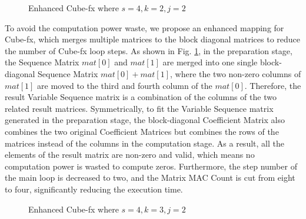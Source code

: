 \begin{figure}[t]
    \caption{Enhanced Cube-fx where $s = 4, k = 2, j = 2$}
    \label{fig:parallel}
    \end{figure}

To avoid the computation power waste, we propose an enhanced mapping for Cube-fx, which merges multiple matrices to the block diagonal matrices to reduce the number of Cube-fx loop steps. As shown in Fig. \ref{fig:parallel}, in the preparation stage, the Sequence Matrix $mat[0]$ and $mat[1]$ are merged into one single block-diagonal Sequence Matrix $mat[0] + mat[1]$, where the two non-zero columns of $mat[1]$ are moved to the third and fourth column of the $mat[0]$. Therefore, the result Variable Sequence matrix is a combination of the columns of the two related result matrices. Symmetrically, to fit the Variable Sequence matrix generated in the preparation stage, the block-diagonal Coefficient Matrix also combines the two original Coefficient Matrices but combines the rows of the matrices instead of the columns in the computation stage. As a result, all the elements of the result matrix are non-zero and valid, which means no computation power is wasted to compute zeros. Furthermore, the step number of the main loop is decreased to two, and the Matrix MAC Count is cut from eight to four, significantly reducing the execution time.

\begin{figure}[t]
    \caption{Enhanced Cube-fx where $s = 4, k = 3, j = 2$}
    \label{fig:parallel_1}
    \end{figure}

